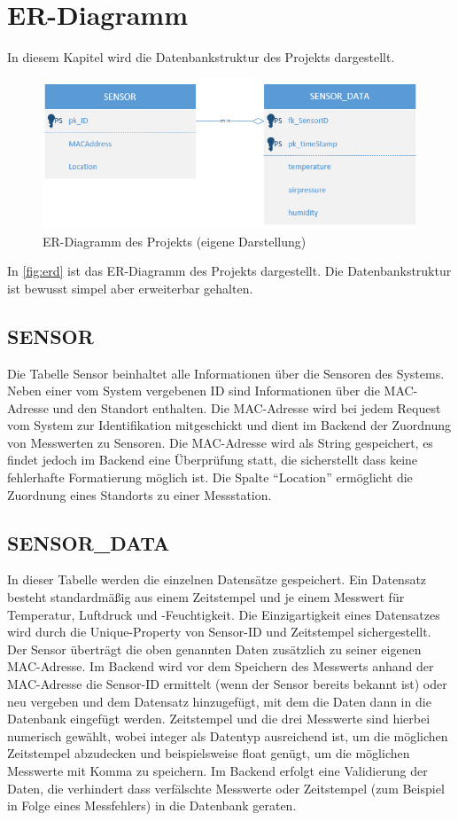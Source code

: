 \section{ER-Diagramm}\label{er-diagramm}
In diesem Kapitel wird die Datenbankstruktur des Projekts dargestellt.\\
\begin{figure}[h]
    \centering
    \includegraphics[width=1\linewidth]{img/erd}
    \caption[ER-Diagramm des Projekts]{ER-Diagramm des Projekts (eigene Darstellung)}
    \label{fig:erd}
\end{figure}

In \autoref{fig:erd} ist das ER-Diagramm des Projekts dargestellt. Die Datenbankstruktur ist bewusst simpel aber erweiterbar gehalten.
\subsection*{SENSOR}
Die Tabelle Sensor beinhaltet alle Informationen über die Sensoren des Systems.
Neben einer vom System vergebenen ID sind Informationen über die MAC-Adresse und den Standort enthalten.
Die MAC-Adresse wird bei jedem Request vom System zur Identifikation mitgeschickt und dient im Backend der Zuordnung von Messwerten zu Sensoren. Die MAC-Adresse wird als String gespeichert, es findet jedoch im Backend eine Überprüfung statt, die sicherstellt dass keine fehlerhafte Formatierung möglich ist.
Die Spalte \enquote{Location} ermöglicht die Zuordnung eines Standorts zu einer Messstation.
\subsection*{SENSOR\_DATA}
In dieser Tabelle werden die einzelnen Datensätze gespeichert.
Ein Datensatz besteht standardmäßig aus einem Zeitstempel und je einem Messwert für Temperatur, Luftdruck und -Feuchtigkeit.
Die Einzigartigkeit eines Datensatzes wird durch die Unique-Property von Sensor-ID und Zeitstempel sichergestellt.
Der Sensor überträgt die oben genannten Daten zusätzlich zu seiner eigenen MAC-Adresse.
Im Backend wird vor dem Speichern des Messwerts anhand der MAC-Adresse die Sensor-ID ermittelt (wenn der Sensor bereits bekannt ist) oder neu vergeben und dem Datensatz hinzugefügt, mit dem die Daten dann in die Datenbank eingefügt werden.
Zeitstempel und die drei Messwerte sind hierbei numerisch gewählt, wobei integer als Datentyp ausreichend ist, um die möglichen Zeitstempel abzudecken und beispielsweise float genügt, um die möglichen Messwerte mit Komma zu speichern.
Im Backend erfolgt eine Validierung der Daten, die verhindert dass verfälschte Messwerte oder Zeitstempel (zum Beispiel in Folge eines Messfehlers) in die Datenbank geraten.\\